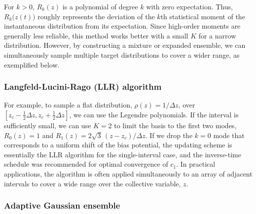 \documentclass[reprint, superscriptaddress, floatfix]{revtex4-1}
\begin{document}
For $k > 0$, $R_k(z)$ is a polynomial of degree $k$ with zero expectation.
%
Thus, $R_k\bigl(z(t)\bigr)$ roughly
represents the deviation of the $k$th statistical moment
of the instantaneous distribution
from its expectation.
Since high-order moments are generally less reliable,
this method works better with a small $K$ for a narrow distribution.
%
However, by constructing
a mixture or expanded ensemble\cite{swendsen1986,
  *geyer1991, *hukushima1996, *hansmann1997, *sugita1999,
  *earl2005, *zuckerman2011, *rauscher2009,
  neuhaus2006, *neuhaus2007, kim2010,
  marinari1992,
  *lyubartsev1992, li2007,
  park2007, *nguyen2013, *zhang2015st, shirts2017},
we can simultaneously sample multiple target distributions
to cover a wider range, as exemplified below.


\subsubsection{Langfeld-Lucini-Rago (LLR) algorithm}

For example,
to sample a flat distribution, $\rho(z) = 1/\Delta z$,
over $\left[z_c - \frac 1 2 \Delta z, z_c + \frac 1 2 \Delta z\right]$,
we can use the Legendre polynomials\cite{arfken}.
%
If the interval is sufficiently small,
we can use $K = 2$ to limit the basis to the first two modes,
$R_0(z) = 1$ and $R_1(z) = 2 \sqrt{3} \, (z - z_c)/\Delta z$.
%
If we drop the $k = 0$ mode
that corresponds to a uniform shift of the bias potential,
the updating scheme is essentially the LLR algorithm\cite{langfeld2012}
for the single-interval case,
and the inverse-time schedule
was recommended for optimal convergence of $c_1$\cite{pellegrini2014}.
%
In practical applications, the algorithm is often applied simultaneously
to an array of adjacent intervals
to cover a wide range over the collective variable, $z$.
%



\subsubsection{\label{sec:age}
Adaptive Gaussian ensemble}
\end{document}
